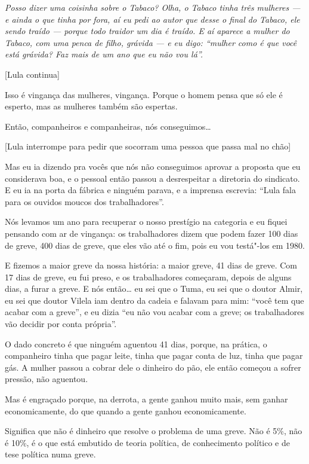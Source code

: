 \emph{Posso dizer uma coisinha sobre o Tabaco? Olha, o Tabaco tinha três
mulheres --- e ainda o que tinha por fora, aí eu pedi ao autor que desse
o final do Tabaco, ele sendo traído --- porque todo traidor um dia é
traído. E aí aparece a mulher do Tabaco, com uma penca de filho, grávida
--- e eu digo: ``mulher como é que você está grávida? Faz mais de um ano
que eu não vou lá''.}

[Lula continua]

Isso é vingança das mulheres, vingança. Porque o homem pensa que
só ele é esperto, mas as mulheres também são espertas.

Então, companheiros e companheiras, nós conseguimos\ldots{}

[Lula interrompe para pedir que socorram uma pessoa que passa
mal no chão]

Mas eu ia dizendo pra vocês que nós não conseguimos aprovar a
proposta que eu considerava boa, e o pessoal então passou a desrespeitar
a diretoria do sindicato. E eu ia na porta da fábrica e ninguém parava,
e a imprensa escrevia: ``Lula fala para os ouvidos moucos dos
trabalhadores''.

Nós levamos um ano para recuperar o nosso prestígio na categoria e
eu fiquei pensando com ar de vingança: os trabalhadores dizem que podem
fazer 100 dias de greve, 400 dias de greve, que eles vão até o fim, pois
eu vou testá"-los em 1980.

E fizemos a maior greve da nossa história: a maior greve, 41 dias
de greve. Com 17 dias de greve, eu fui preso, e os trabalhadores
começaram, depois de alguns dias, a furar a greve. E nós então\ldots{} eu sei
que o Tuma, eu sei que o doutor Almir, eu sei que doutor Vilela iam
dentro da cadeia e falavam para mim: ``você tem que acabar com a greve'',
e eu dizia ``eu não vou acabar com a greve; os trabalhadores vão decidir
por conta própria''.

O dado concreto é que ninguém aguentou 41 dias, porque, na
prática, o companheiro tinha que pagar leite, tinha que pagar conta de
luz, tinha que pagar gás. A mulher passou a cobrar dele o dinheiro do
pão, ele então começou a sofrer pressão, não aguentou.

Mas é engraçado porque, na derrota, a gente ganhou muito mais, sem
ganhar economicamente, do que quando a gente ganhou economicamente.

Significa que não é dinheiro que resolve o problema de uma greve.
Não é 5\%, não é 10\%, é o que está embutido de teoria política, de
conhecimento político e de tese política numa greve.

